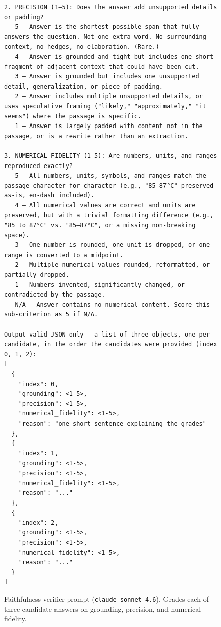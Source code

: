\begin{figure}[h!]
\begin{minipage}{0.95\textwidth}
\begin{Verbatim}[breaklines=true, breakanywhere=true]
2. PRECISION (1–5): Does the answer add unsupported details or padding?
   5 — Answer is the shortest possible span that fully answers the question. Not one extra word. No surrounding context, no hedges, no elaboration. (Rare.)
   4 — Answer is grounded and tight but includes one short fragment of adjacent context that could have been cut.
   3 — Answer is grounded but includes one unsupported detail, generalization, or piece of padding.
   2 — Answer includes multiple unsupported details, or uses speculative framing ("likely," "approximately," "it seems") where the passage is specific.
   1 — Answer is largely padded with content not in the passage, or is a rewrite rather than an extraction.

3. NUMERICAL FIDELITY (1–5): Are numbers, units, and ranges reproduced exactly?
   5 — All numbers, units, symbols, and ranges match the passage character-for-character (e.g., "85–87°C" preserved as-is, en-dash included).
   4 — All numerical values are correct and units are preserved, but with a trivial formatting difference (e.g., "85 to 87°C" vs. "85–87°C", or a missing non-breaking space).
   3 — One number is rounded, one unit is dropped, or one range is converted to a midpoint.
   2 — Multiple numerical values rounded, reformatted, or partially dropped.
   1 — Numbers invented, significantly changed, or contradicted by the passage.
   N/A — Answer contains no numerical content. Score this sub-criterion as 5 if N/A.

Output valid JSON only — a list of three objects, one per candidate, in the order the candidates were provided (index 0, 1, 2):
[
  {
    "index": 0,
    "grounding": <1-5>,
    "precision": <1-5>,
    "numerical_fidelity": <1-5>,
    "reason": "one short sentence explaining the grades"
  },
  {
    "index": 1,
    "grounding": <1-5>,
    "precision": <1-5>,
    "numerical_fidelity": <1-5>,
    "reason": "..."
  },
  {
    "index": 2,
    "grounding": <1-5>,
    "precision": <1-5>,
    "numerical_fidelity": <1-5>,
    "reason": "..."
  }
]
\end{Verbatim}
\end{minipage}
\caption{Faithfulness verifier prompt (\texttt{claude-sonnet-4.6}). Grades each of three candidate answers on grounding, precision, and numerical fidelity.}
\label{fig:verifier-faith}
\end{figure}


